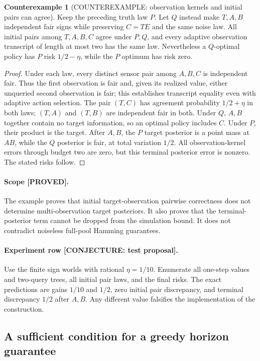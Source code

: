 \documentclass[11pt]{article}
\theoremstyle{definition}
\newtheorem{counterexample}[theorem]{Counterexample}
\theoremstyle{remark}
\begin{document}
\begin{counterexample}[COUNTEREXAMPLE: observation kernels and initial pairs can agree]
Keep the preceding truth law $P$.  Let $Q$ instead make $T,A,B$ independent
fair signs while preserving $C=TE$ and the same noise law.  All initial
pairs among $T,A,B,C$ agree under $P,Q$, and every adaptive observation
transcript of length at most two has the same law.  Nevertheless a
$Q$-optimal policy has $P$ risk $1/2-\eta$, while the $P$ optimum has
risk zero.
\end{counterexample}
\begin{proof}
Under each law, every distinct sensor pair among $A,B,C$ is independent
fair.  Thus the first observation is fair and, given its realized value,
either unqueried second observation is fair; this establishes transcript
equality even with adaptive action selection.  The pair $(T,C)$ has
agreement probability $1/2+\eta$ in both laws; $(T,A)$ and $(T,B)$ are
independent fair in both.  Under $Q$, $A,B$ together contain no target
information, so an optimal policy includes $C$.  Under $P$, their product
is the target.  After $A,B$, the $P$ target posterior is a point mass at
$AB$, while the $Q$ posterior is fair, at total variation $1/2$.  All
observation-kernel errors through budget two are zero, but this terminal
posterior error is nonzero.  The stated risks follow.
\end{proof}

\paragraph{Scope [PROVED].}
The example proves that initial target-observation pairwise correctness
does not determine multi-observation target posteriors.  It also proves
that the terminal-posterior term cannot be dropped from the simulation
bound.  It does not contradict noiseless full-pool Hamming guarantees.

\paragraph{Experiment row [CONJECTURE: test proposal].}
Use the finite sign worlds with rational $\eta=1/10$.  Enumerate all
one-step values and two-query trees, all initial pair laws, and the final
risks.  The exact predictions are gains $1/10$ and $1/2$, zero initial
pair discrepancy, and terminal discrepancy $1/2$ after $A,B$.  Any
different value falsifies the implementation of the construction.

\subsection{A sufficient condition for a greedy horizon guarantee}
\end{document}

